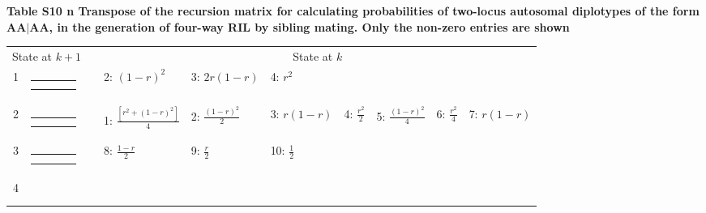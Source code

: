 \documentclass[9pt,letterpaper,twoside]{article}
\begin{document}
\newpage

\noindent \textbf{Table S10 {\color{white} n} Transpose of the recursion matrix for
calculating probabilities of two-locus autosomal diplotypes of the form $\boldsymbol{\boldsymbol{AA|AA}}$,
in the generation of four-way RIL by sibling mating.  Only the
non-zero entries are shown}

\bigskip

{
\begin{center}
\begin{tabular}{ccclllllll} \hline
\multicolumn{2}{c}{State at $k+1$} & &
\multicolumn{7}{c}{State at $k$} \\
\cline{1-2} \cline{4-10}
1 &
{\renewcommand{\arraystretch}{0.3}
\renewcommand{\tabcolsep}{0.5mm}
\parbox[b][3mm][c]{12mm}{
\begin{tabular}{|p{2mm}|p{2mm}||p{2mm}|p{2mm}|} \hline
$\bullet$ & $\bullet$ &           &           \\
$\bullet$ & $\bullet$ &           &           \\ \hline
\end{tabular}}}
&
& 2: $(1-r)^2$
& 3: $2r(1-r)$
& 4: $r^2$
& & & & \\
2 &
{\renewcommand{\arraystretch}{0.3}
\renewcommand{\tabcolsep}{0.5mm}
\parbox[b][3mm][c]{12mm}{
\begin{tabular}{|p{2mm}|p{2mm}||p{2mm}|p{2mm}|} \hline
$\bullet$ &           & $\bullet$ &           \\
$\bullet$ &           & $\bullet$ &           \\ \hline
\end{tabular}}}
&
& 1: $\frac{[r^2+(1-r)^2]}{4}$
& 2: $\frac{(1-r)^2}{2}$
& 3: $r(1-r)$
& 4: $\frac{r^2}{2}$
& 5: $\frac{(1-r)^2}{4}$
& 6: $\frac{r^2}{4}$
& 7: $r(1-r)$
\\
3 &
{\renewcommand{\arraystretch}{0.3}
\renewcommand{\tabcolsep}{0.5mm}
\parbox[b][3mm][c]{12mm}{
\begin{tabular}{|p{2mm}|p{2mm}||p{2mm}|p{2mm}|} \hline
$\bullet$ &           & $\bullet$ &           \\
$\bullet$ &           &           & $\bullet$ \\ \hline
\end{tabular}}}
&
& 8: $\frac{1-r}{2}$
& 9: $\frac{r}{2}$
& 10: $\frac{1}{2}$
& & & & \\
4 &
{\renewcommand{\arraystretch}{0.3}
\renewcommand{\tabcolsep}{0.5mm}
\parbox[b][3mm][c]{12mm}{
\begin{tabular}{|p{2mm}|p{2mm}||p{2mm}|p{2mm}|} \hline

\end{tabular}}}
\end{tabular}
\end{center}}
\end{document}

